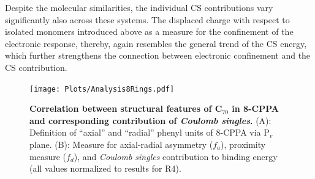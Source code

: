 \documentclass[aps,prl,groupaddress, twocolumn]{revtex4-1}  %
\begin{document}
Despite the molecular similarities, the individual CS contributions vary significantly also across these systems.
The displaced charge with respect to isolated monomers introduced above as a measure for the confinement of the electronic response, thereby, again resembles the general trend of the CS energy, which further strengthens the connection between electronic confinement and the CS contribution.
\begin{figure}[htp]
\texttt{[image: Plots/Analysis8Rings.pdf]}
\caption{\textbf{Correlation between structural features of C$_{70}$ in 8-CPPA and corresponding contribution of \emph{Coulomb singles}.} (A): Definition of ``axial'' and ``radial'' phenyl units of 8-CPPA via P$_v$ plane. (B): Measure for axial-radial asymmetry ($f_a$), proximity measure ($f_d$), and \emph{Coulomb singles} contribution to binding energy (all values normalized to results for R4).}\label{fig:analysis_rings}
\end{figure}
\end{document}
